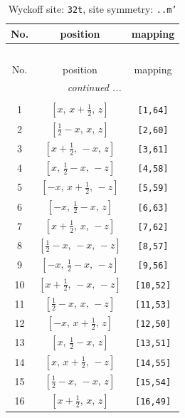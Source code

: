 \documentclass[fleqn,8pt]{jsarticle}
\begin{document}
\begin{longtable}{ccc}
\caption{Wyckoff site: {\tt 32t}, site symmetry: {\tt ..m'}}
 \\
 \hline \hline
No. & position & mapping \\ \hline \endfirsthead

\multicolumn{2}{l}{\tablename\ \thetable{}} \\
 \hline \hline
No. & position & mapping \\ \hline \endhead

 \hline \hline
\multicolumn{2}{r}{\footnotesize\it continued ...} \\ \endfoot

 \hline \hline
\multicolumn{2}{r}{} \\ \endlastfoot

1 & $\left[ x,\, x + \frac{1}{2},\, z \right]$ & {\tt [1,64]} \\ \hline
2 & $\left[ \frac{1}{2} - x,\, x,\, z \right]$ & {\tt [2,60]} \\ \hline
3 & $\left[ x + \frac{1}{2},\, - x,\, z \right]$ & {\tt [3,61]} \\ \hline
4 & $\left[ x,\, \frac{1}{2} - x,\, - z \right]$ & {\tt [4,58]} \\ \hline
5 & $\left[ - x,\, x + \frac{1}{2},\, - z \right]$ & {\tt [5,59]} \\ \hline
6 & $\left[ - x,\, \frac{1}{2} - x,\, z \right]$ & {\tt [6,63]} \\ \hline
7 & $\left[ x + \frac{1}{2},\, x,\, - z \right]$ & {\tt [7,62]} \\ \hline
8 & $\left[ \frac{1}{2} - x,\, - x,\, - z \right]$ & {\tt [8,57]} \\ \hline
9 & $\left[ - x,\, \frac{1}{2} - x,\, - z \right]$ & {\tt [9,56]} \\ \hline
10 & $\left[ x + \frac{1}{2},\, - x,\, - z \right]$ & {\tt [10,52]} \\ \hline
11 & $\left[ \frac{1}{2} - x,\, x,\, - z \right]$ & {\tt [11,53]} \\ \hline
12 & $\left[ - x,\, x + \frac{1}{2},\, z \right]$ & {\tt [12,50]} \\ \hline
13 & $\left[ x,\, \frac{1}{2} - x,\, z \right]$ & {\tt [13,51]} \\ \hline
14 & $\left[ x,\, x + \frac{1}{2},\, - z \right]$ & {\tt [14,55]} \\ \hline
15 & $\left[ \frac{1}{2} - x,\, - x,\, z \right]$ & {\tt [15,54]} \\ \hline
16 & $\left[ x + \frac{1}{2},\, x,\, z \right]$ & {\tt [16,49]} \\ \hline

\end{longtable}
\end{document}
